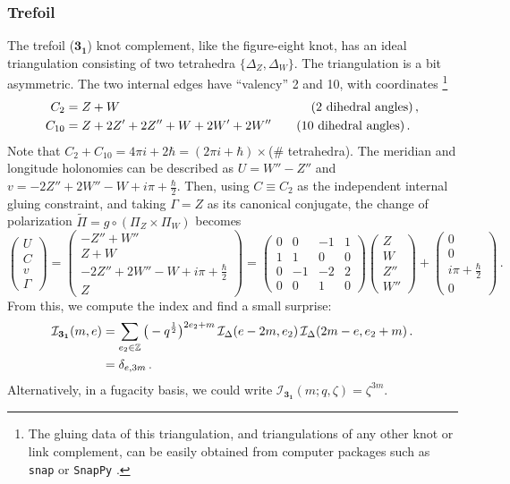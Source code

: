 \documentclass[11pt,letterpaper]{article}
\numberwithin{equation}{section}
\newcommand{\be}{\begin{equation}}
\newcommand{\ee}{\end{equation}}
\newcommand{\mb}{\mathbf}
\newcommand{\wt}{\widetilde}
\newcommand{\Z}{{\mathbb Z}}
\newcommand{\CI}{\mathcal{I}}
\begin{document}
\subsubsection*{Trefoil}


The trefoil ($\mb{3_1}$) knot complement, like the figure-eight knot, has an ideal triangulation consisting of two tetrahedra $\{\Delta_Z,\Delta_W\}$. The triangulation is a bit asymmetric. The two internal edges have ``valency'' 2 and 10, with coordinates%
%
\footnote{The gluing data of this triangulation, and triangulations of any other knot or link complement, can be easily obtained from computer packages such as \texttt{snap} \cite{snap} or \texttt{SnapPy} \cite{SnapPy}.}
%
\begin{align} C_2 &= Z+W  \hspace{2.12in}\text{(2 dihedral angles)}\,, \notag \\
 C_{10} &= Z+2Z'+2Z''+W+2W'+2W''  \qquad\text{(10 dihedral angles)}\,.
\end{align}
%
Note that $C_2+C_{10}=4\pi i+2\hbar = (2\pi i+\hbar)\times$(\#\! tetrahedra). The meridian and longitude holonomies can be described as $U = W''-Z''$ and $v = -2Z''+2W''-W+i\pi+\tfrac\hbar2$. Then, using $C\equiv C_2$ as the independent internal gluing constraint, and taking $\Gamma = Z$ as its canonical conjugate, the change of polarization $\wt\Pi=g\circ(\Pi_Z\times\Pi_W)$ becomes
%
\be \begin{pmatrix} U\\ C\\v\\\Gamma \end{pmatrix}
 = \begin{pmatrix} -Z''+W''\\ Z+W \\ -2Z''+2W''-W+i\pi+\tfrac\hbar2\\ Z \end{pmatrix}
 = \begin{pmatrix} 0 & 0 & -1 & 1 \\
 1 & 1 & 0 & 0 \\
 0 & -1 & -2 & 2 \\
 0 & 0 & 1 & 0\end{pmatrix}\begin{pmatrix} Z \\ W \\ Z'' \\ W''\end{pmatrix} +\begin{pmatrix}0\\0\\ i\pi+\tfrac\hbar2\\0\end{pmatrix}\,.
\label{pol31}
\ee
%
From this, we compute the index and find a small surprise:
%
\begin{align} \CI_{\mb{3_1}}(m,e) &= \sum_{e_2\in\Z}\big(-q^{\frac12}\big)^{2e_2+m}\,\CI_\Delta(e-2m,e_2)\,\CI_\Delta(2m-e,e_2+m)\,.\notag \\
&= \delta_{e,3m}\,. \label{ind31} \end{align}
%
Alternatively, in a fugacity basis, we could write $\CI_{\mb{3_1}}(m;q,\zeta) = \zeta^{3m}$.
\end{document}
